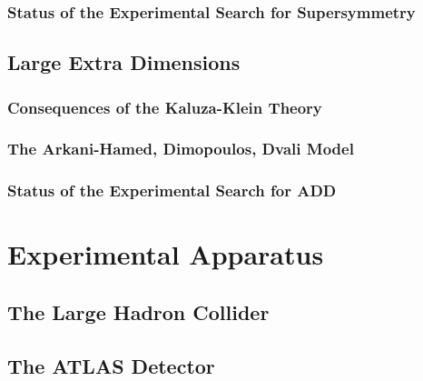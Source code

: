 \documentclass[10pt,twoside,cucitura,classica,english,openany]{toptesi}
\begin{document}


\subsection{Status of the Experimental Search for Supersymmetry}
\label{sec:susy-exper-search}



\section{Large Extra Dimensions}
\label{sec:large-extra-dimens}



\subsection{Consequences of the Kaluza-Klein Theory}
\label{sec:cons-kaluza-klein}



\subsection{The Arkani-Hamed, Dimopoulos, Dvali Model}
\label{sec:arkani-hamed-dimop}



\subsection{Status of the Experimental Search for ADD}
\label{sec:add-exper-search}



\chapter{Experimental Apparatus}
\label{cha:exper-appar}

\section{The Large Hadron Collider}
\label{sec:large-hadr-coll}



\section{The ATLAS Detector}
\label{sec:atlas-detector}
\end{document}
